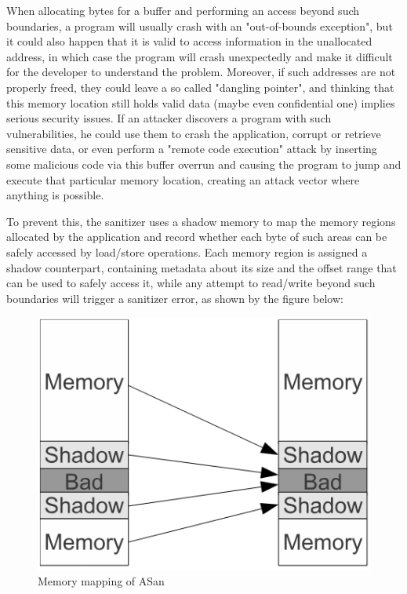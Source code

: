 When allocating bytes for a buffer and performing an access beyond such boundaries, a program will usually crash with an "out-of-bounds exception", but it could also happen that it is valid to access information in the unallocated address, in which case the program will crash unexpectedly and make it difficult for the developer to understand the problem. Moreover, if such addresses are not properly freed, they could leave a so called "dangling pointer", and thinking that this memory location still holds valid data (maybe even confidential one) implies serious security issues.
If an attacker discovers a program with such vulnerabilities, he could use them to crash the application, corrupt or retrieve sensitive data, or even perform a "remote code execution" attack by inserting some malicious code via this buffer overrun and causing the program to jump and execute that particular memory location, creating an attack vector where anything is possible. 

To prevent this, the sanitizer uses a shadow memory to map the memory regions allocated by the application and record whether each byte of such areas can be safely accessed by load/store operations. Each memory region is assigned a shadow counterpart, containing metadata about its size and the offset range that can be used to safely access it, while any attempt to read/write beyond such boundaries will trigger a sanitizer error, as shown by the figure below:

\begin{figure}[h]
\centering
\includegraphics[scale=0.6]{foto/shadow_memory.png}
\caption{Memory mapping of ASan \cite{serebryany2012addresssanitizer}}
\label{fig:asan_shadow}
\end{figure}

